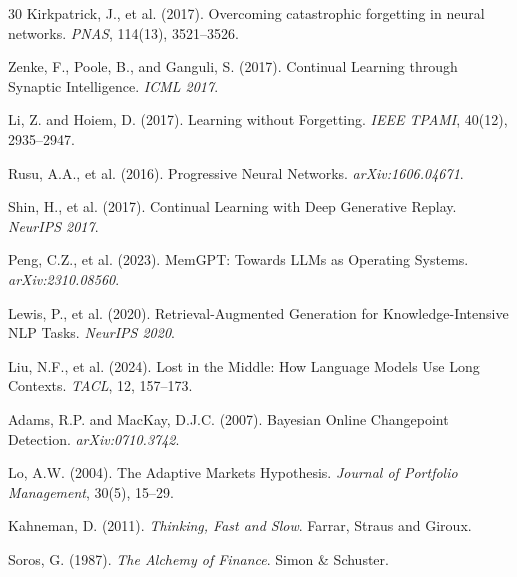 \documentclass[11pt, a4paper]{article}
\begin{document}
\begin{thebibliography}{30}
Kirkpatrick, J., et al. (2017).
Overcoming catastrophic forgetting in neural networks.
\textit{PNAS}, 114(13), 3521--3526.

Zenke, F., Poole, B., and Ganguli, S. (2017).
Continual Learning through Synaptic Intelligence.
\textit{ICML 2017}.

Li, Z. and Hoiem, D. (2017).
Learning without Forgetting.
\textit{IEEE TPAMI}, 40(12), 2935--2947.

Rusu, A.A., et al. (2016).
Progressive Neural Networks.
\textit{arXiv:1606.04671}.

Shin, H., et al. (2017).
Continual Learning with Deep Generative Replay.
\textit{NeurIPS 2017}.

Peng, C.Z., et al. (2023).
MemGPT: Towards LLMs as Operating Systems.
\textit{arXiv:2310.08560}.

Lewis, P., et al. (2020).
Retrieval-Augmented Generation for Knowledge-Intensive NLP Tasks.
\textit{NeurIPS 2020}.

Liu, N.F., et al. (2024).
Lost in the Middle: How Language Models Use Long Contexts.
\textit{TACL}, 12, 157--173.

Adams, R.P. and MacKay, D.J.C. (2007).
Bayesian Online Changepoint Detection.
\textit{arXiv:0710.3742}.

Lo, A.W. (2004).
The Adaptive Markets Hypothesis.
\textit{Journal of Portfolio Management}, 30(5), 15--29.

Kahneman, D. (2011).
\textit{Thinking, Fast and Slow}.
Farrar, Straus and Giroux.

Soros, G. (1987).
\textit{The Alchemy of Finance}.
Simon \& Schuster.

\end{thebibliography}
\end{document}
